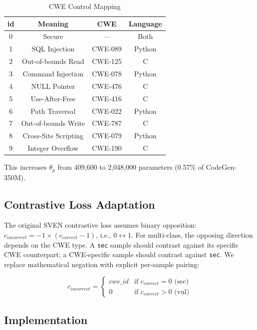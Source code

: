 \documentclass[conference]{IEEEtran}
\begin{document}
\begin{table}[h]
\centering
\caption{CWE Control Mapping}
\label{tab:cwe_map}
\begin{tabular}{c|c|c|c}
\toprule
\textbf{id} & \textbf{Meaning} & \textbf{CWE} & \textbf{Language} \\
\midrule
0 & Secure & --- & Both \\
1 & SQL Injection & CWE-089 & Python \\
2 & Out-of-bounds Read & CWE-125 & C \\
3 & Command Injection & CWE-078 & Python \\
4 & NULL Pointer & CWE-476 & C \\
5 & Use-After-Free & CWE-416 & C \\
6 & Path Traversal & CWE-022 & Python \\
7 & Out-of-bounds Write & CWE-787 & C \\
8 & Cross-Site Scripting & CWE-079 & Python \\
9 & Integer Overflow & CWE-190 & C \\
\bottomrule
\end{tabular}
\end{table}

This increases $\theta_p$ from 409,600 to 2,048,000 parameters (0.57\% of CodeGen-350M).

\subsection{Contrastive Loss Adaptation}

The original SVEN contrastive loss assumes binary opposition: $c_{incorrect} = -1 \times (c_{correct} - 1)$, i.e., $0 \leftrightarrow 1$. For multi-class, the opposing direction depends on the CWE type. A \texttt{sec} sample should contrast against its specific CWE counterpart; a CWE-specific sample should contrast against \texttt{sec}. We replace mathematical negation with explicit per-sample pairing:

\begin{equation}
c_{incorrect} = \begin{cases} cwe\_id & \text{if } c_{correct} = 0 \text{ (sec)} \\ 0 & \text{if } c_{correct} > 0 \text{ (vul)} \end{cases}
\end{equation}

\subsection{Implementation}
\end{document}
